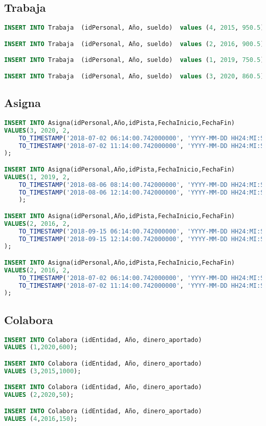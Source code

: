 \subsection{Trabaja}
\begin{lstlisting}[language=sql]
INSERT INTO Trabaja  (idPersonal, Año, sueldo)  values (4, 2015, 950.5);

INSERT INTO Trabaja  (idPersonal, Año, sueldo)  values (2, 2016, 900.5);

INSERT INTO Trabaja  (idPersonal, Año, sueldo)  values (1, 2019, 750.5);

INSERT INTO Trabaja  (idPersonal, Año, sueldo)  values (3, 2020, 860.5);
\end{lstlisting}

\subsection{Asigna}
\begin{lstlisting}[language=sql]
INSERT INTO Asigna(idPersonal,Año,idPista,FechaInicio,FechaFin)
VALUES(3, 2020, 2,
	TO_TIMESTAMP('2018-07-02 06:14:00.742000000', 'YYYY-MM-DD HH24:MI:SS.FF'),
	TO_TIMESTAMP('2018-07-02 11:14:00.742000000', 'YYYY-MM-DD HH24:MI:SS.FF')
);

INSERT INTO Asigna(idPersonal,Año,idPista,FechaInicio,FechaFin)
VALUES(1, 2019, 2,
	TO_TIMESTAMP('2018-08-06 08:14:00.742000000', 'YYYY-MM-DD HH24:MI:SS.FF'),
	TO_TIMESTAMP('2018-08-06 12:14:00.742000000', 'YYYY-MM-DD HH24:MI:SS.FF')
	);

INSERT INTO Asigna(idPersonal,Año,idPista,FechaInicio,FechaFin)
VALUES(2, 2016, 2,
	TO_TIMESTAMP('2018-09-15 06:14:00.742000000', 'YYYY-MM-DD HH24:MI:SS.FF'),
	TO_TIMESTAMP('2018-09-15 12:14:00.742000000', 'YYYY-MM-DD HH24:MI:SS.FF')
);

INSERT INTO Asigna(idPersonal,Año,idPista,FechaInicio,FechaFin)
VALUES(2, 2016, 2,
	TO_TIMESTAMP('2018-07-02 06:14:00.742000000', 'YYYY-MM-DD HH24:MI:SS.FF'),
	TO_TIMESTAMP('2018-07-02 11:14:00.742000000', 'YYYY-MM-DD HH24:MI:SS.FF')
);
\end{lstlisting}

\subsection{Colabora}
\begin{lstlisting}[language=sql]
INSERT INTO Colabora (idEntidad, Año, dinero_aportado)
VALUES (1,2020,600);

INSERT INTO Colabora (idEntidad, Año, dinero_aportado)
VALUES (3,2015,1000);

INSERT INTO Colabora (idEntidad, Año, dinero_aportado)
VALUES (2,2020,50);

INSERT INTO Colabora (idEntidad, Año, dinero_aportado)
VALUES (4,2016,150);
\end{lstlisting}

